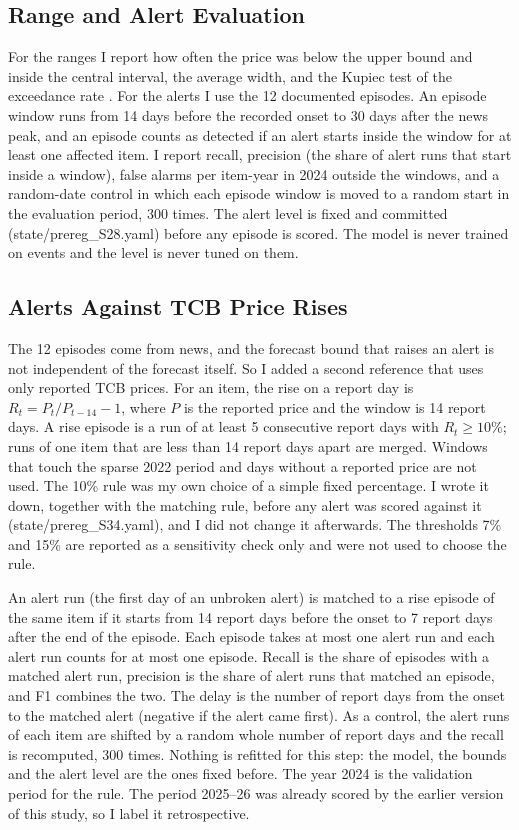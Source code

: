 \subsection{Range and Alert Evaluation}
For the ranges I report how often the price was below the upper bound and inside the central interval, the average width, and the Kupiec test of the exceedance rate \cite{kupiec}. For the alerts I use the 12 documented episodes. An episode window runs from 14 days before the recorded onset to 30 days after the news peak, and an episode counts as detected if an alert starts inside the window for at least one affected item. I report recall, precision (the share of alert runs that start inside a window), false alarms per item-year in 2024 outside the windows, and a random-date control in which each episode window is moved to a random start in the evaluation period, 300 times. The alert level is fixed and committed (state/prereg\_S28.yaml) before any episode is scored. The model is never trained on events and the level is never tuned on them.

\subsection{Alerts Against TCB Price Rises}\label{sec:riserule}
The 12 episodes come from news, and the forecast bound that raises an alert is not independent of the forecast itself. So I added a second reference that uses only reported TCB prices. For an item, the rise on a report day is $R_t = P_t / P_{t-14} - 1$, where $P$ is the reported price and the window is 14 report days. A rise episode is a run of at least 5 consecutive report days with $R_t \ge 10\%$; runs of one item that are less than 14 report days apart are merged. Windows that touch the sparse 2022 period and days without a reported price are not used. The 10\% rule was my own choice of a simple fixed percentage. I wrote it down, together with the matching rule, before any alert was scored against it (state/prereg\_S34.yaml), and I did not change it afterwards. The thresholds 7\% and 15\% are reported as a sensitivity check only and were not used to choose the rule.

An alert run (the first day of an unbroken alert) is matched to a rise episode of the same item if it starts from 14 report days before the onset to 7 report days after the end of the episode. Each episode takes at most one alert run and each alert run counts for at most one episode. Recall is the share of episodes with a matched alert run, precision is the share of alert runs that matched an episode, and F1 combines the two. The delay is the number of report days from the onset to the matched alert (negative if the alert came first). As a control, the alert runs of each item are shifted by a random whole number of report days and the recall is recomputed, 300 times. Nothing is refitted for this step: the model, the bounds and the alert level are the ones fixed before. The year 2024 is the validation period for the rule. The period 2025--26 was already scored by the earlier version of this study, so I label it retrospective.
